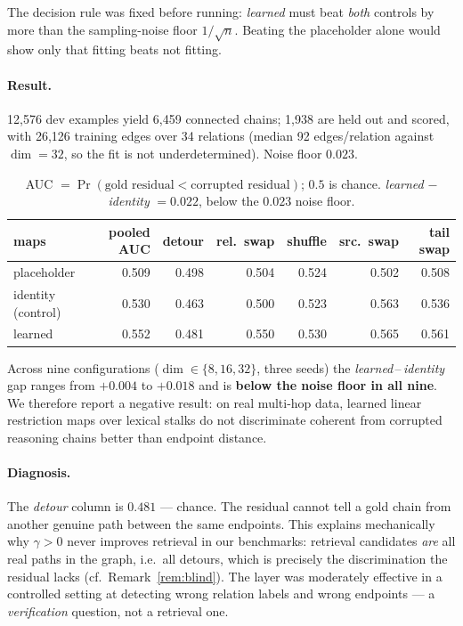 \documentclass[11pt]{article}
\theoremstyle{definition}
\begin{document}
The decision rule was fixed before running: \emph{learned} must beat \emph{both}
controls by more than the sampling-noise floor $1/\sqrt{n}$. Beating the placeholder
alone would show only that fitting beats not fitting.

\paragraph{Result.} 12{,}576 dev examples yield 6{,}459 connected chains; 1{,}938 are
held out and scored, with 26{,}126 training edges over 34 relations (median 92
edges/relation against $\dim=32$, so the fit is not underdetermined). Noise floor
$0.023$.

\begin{table}[h]
\centering
\begin{tabular}{lrrrrrr}
\toprule
maps & pooled AUC & detour & rel.\ swap & shuffle & src.\ swap & tail swap \\
\midrule
placeholder        & 0.509 & 0.498 & 0.504 & 0.524 & 0.502 & 0.508 \\
identity (control) & 0.530 & 0.463 & 0.500 & 0.523 & 0.563 & 0.536 \\
learned            & 0.552 & 0.481 & 0.550 & 0.530 & 0.565 & 0.561 \\
\bottomrule
\end{tabular}
\caption{AUC $=\Pr(\text{gold residual} < \text{corrupted residual})$; $0.5$ is chance.
\emph{learned} $-$ \emph{identity} $=0.022$, below the $0.023$ noise floor.}
\end{table}

Across nine configurations ($\dim\in\{8,16,32\}$, three seeds) the
\emph{learned}\,--\,\emph{identity} gap ranges from $+0.004$ to $+0.018$ and is
\textbf{below the noise floor in all nine}. We therefore report a negative result: on
real multi-hop data, learned linear restriction maps over lexical stalks do not
discriminate coherent from corrupted reasoning chains better than endpoint distance.

\paragraph{Diagnosis.} The \emph{detour} column is $0.481$ --- chance. The residual
cannot tell a gold chain from another genuine path between the same endpoints. This
explains mechanically why $\gamma>0$ never improves retrieval in our benchmarks:
retrieval candidates \emph{are} all real paths in the graph, i.e.\ all detours, which is
precisely the discrimination the residual lacks (cf.\ Remark~\ref{rem:blind}). The layer
was moderately effective in a controlled setting at detecting wrong relation labels and
wrong endpoints --- a \emph{verification} question, not a retrieval one.
\end{document}
